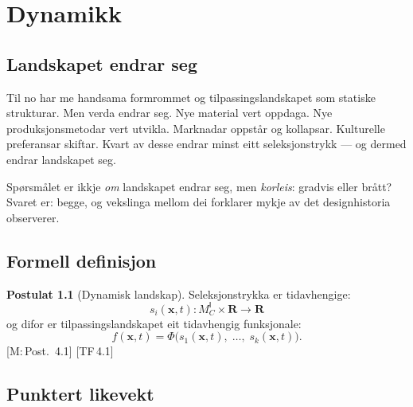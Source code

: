 \documentclass[10pt]{book}
\theoremstyle{definition}
\newtheorem{postulat}[definisjon]{Postulat}
\theoremstyle{plain}
\theoremstyle{remark}
\newcommand{\MC}{M^{\mathsf{I}}_C}
\providecommand{\R}{}
\renewcommand{\R}{\mathbf{R}}
\newcommand{\TF}[1]{\textnormal{[TF\,#1]}}
\newcommand{\Mref}[1]{\textnormal{[M:\,#1]}}
\begin{document}
\chapter{Dynamikk}\label{kap:dynamikk}

\section{Landskapet endrar seg}\label{sec:dyn:intuisjon}

Til no har me handsama formrommet og tilpassingslandskapet som statiske strukturar. Men verda endrar seg. Nye material vert oppdaga. Nye produksjonsmetodar vert utvikla. Marknadar oppst\aa r og kollapsar. Kulturelle preferansar skiftar. Kvart av desse endrar minst eitt seleksjonstrykk --- og dermed endrar landskapet seg.

Sp\o rsm\aa let er ikkje \emph{om} landskapet endrar seg, men \emph{korleis}: gradvis eller brått? Svaret er: begge, og vekslinga mellom dei forklarer mykje av det designhistoria observerer.

\section{Formell definisjon}\label{sec:dyn:def}

\begin{postulat}[Dynamisk landskap]\label{post:dynamisk}
Seleksjonstrykka er tidavhengige:
\[
  s_i(\bm{x}, t) : \MC \times \R \longrightarrow \R
\]
og difor er tilpassingslandskapet eit tidavhengig funksjonale:
\[
  f(\bm{x}, t) = \Phi\bigl(s_1(\bm{x}, t),\; \ldots,\; s_k(\bm{x}, t)\bigr).
\]
\Mref{Post.~4.1} \TF{4.1}
\end{postulat}

\section{Punktert likevekt}\label{sec:dyn:punktert}
\end{document}
